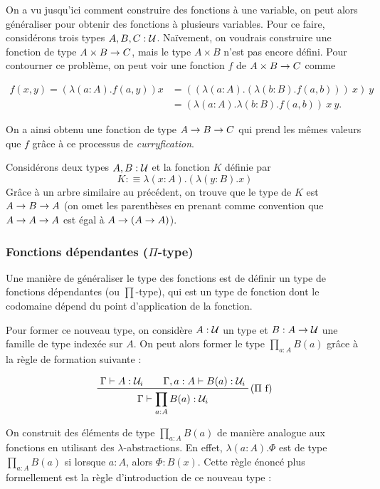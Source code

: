 \documentclass[../../rapport.tex]{subfiles}
\begin{document}
  On a vu jusqu'ici comment construire des fonctions à une variable, on peut alors généraliser pour obtenir
  des fonctions à plusieurs variables.
  Pour ce faire, considérons trois types $A, B, C : \mathcal U$.
  Naïvement, on voudrais construire une fonction de type $A \times B \rightarrow C$,
  mais le type $A \times B$ n'est pas encore défini.
  Pour contourner ce problème, on peut voir une fonction $f$ de $A \times B \rightarrow C$ comme

  \begin{align}
    f(x, y) = (\lambda(a : A). f(a, y)) x &= ((\lambda(a : A). (\lambda(b : B). f(a, b)))\ x)\ y \\ 
					  &= (\lambda(a : A).\lambda(b : B). f(a, b))\ x\ y.
  \end{align}

  On a ainsi obtenu une fonction de type $A \rightarrow B \rightarrow C$ qui prend les mêmes valeurs que $f$
  grâce à ce processus de \textit{curryfication}.

  \begin{example}
    Considérons deux types $A, B : \mathcal U$ et la fonction $K$ définie par
    $$K :\equiv \lambda(x : A).(\lambda(y : B).x)$$
    Grâce à un arbre similaire au précédent, on trouve que le type de $K$ est $A \rightarrow B \rightarrow A$
    (on omet les parenthèses en prenant comme convention que $A \rightarrow A \rightarrow A$ est égal à $A \rightarrow (A \rightarrow A)$).
  \end{example}

  \subsubsection{Fonctions dépendantes ($\Pi$-type)}

  Une manière de généraliser le type des fonctions est de définir un type de fonctions dépendantes (ou $\prod$-type),
  qui est un type de fonction dont le codomaine dépend du point d'application de la fonction.

  Pour former ce nouveau type, on considère $A : \mathcal U$ un type et $B : A \rightarrow \mathcal U$ une famille de type indexée sur $A$.
  On peut alors former le type $\prod_{a : A}{B(a)}$ grâce à la règle de formation suivante :

  $$
  \prfinterspace=2em
  \prftree[r]{($\Pi$ f)}{\Gamma \vdash A : \U_i}{\Gamma, a : A \vdash B(a) : \U_i}
    {\Gamma \vdash \prod_{a:A}{B(a)} : \U_i}
  $$

  On construit des éléments de type $\prod_{a:A}{B(a)}$ de manière analogue aux fonctions en utilisant des $\lambda$-abstractions.
  En effet, $\lambda(a : A). \Phi$ est de type $\prod_{a:A}{B(a)}$ si lorsque $a : A$, alors $\Phi : B(x)$.
  Cette règle énoncé plus formellement est la règle d'introduction de ce nouveau type :
\end{document}
